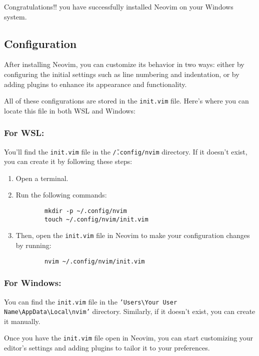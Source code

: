\documentclass[12pt, letterpaper]{article}
\begin{document}
Congratulations!! you have successfully installed Neovim on your Windows system.
\subsection{Configuration}
After installing Neovim, you can customize its behavior in two ways: either by configuring the initial settings such as line numbering and indentation, or by adding plugins to enhance its appearance and functionality.

All of these configurations are stored in the \texttt{init.vim} file. Here's where you can locate this file in both WSL and Windows:

\subsubsection{For WSL:}
You'll find the \texttt{init.vim} file in the \texttt{\~/.config/nvim} directory. If it doesn't exist, you can create it by following these steps:
\begin{enumerate}
    \item Open a terminal.
    \item Run the following commands:
    \begin{verbatim}
        mkdir -p ~/.config/nvim
        touch ~/.config/nvim/init.vim
    \end{verbatim}
    \item Then, open the \texttt{init.vim} file in Neovim to make your configuration changes by running:
    \begin{verbatim}
        nvim ~/.config/nvim/init.vim
    \end{verbatim}
\end{enumerate}

\subsubsection{For Windows:}
You can find the \texttt{init.vim} file in the \texttt{'Users\textbackslash Your User Name\textbackslash AppData\textbackslash Local\textbackslash nvim'} directory. Similarly, if it doesn't exist, you can create it manually.

Once you have the \texttt{init.vim} file open in Neovim, you can start customizing your editor's settings and adding plugins to tailor it to your preferences.


\paragraph{ }
\end{document}
